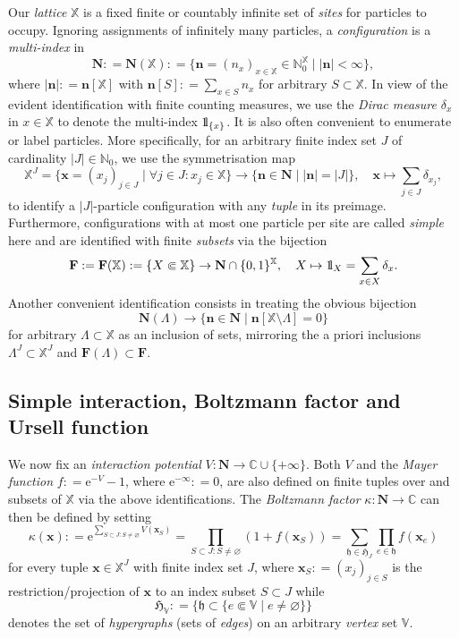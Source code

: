 \documentclass[10pt,a4paper]{amsart}
\newcommand{\e}{\mathrm{e}}
\newcommand{\N}{\mathbb{N}}
\newcommand{\C}{\mathbb{C}}
\newcommand{\X}{\mathbb X}
\newcommand{\V}{\mathbb V}
\def\1{{\mathchoice {1\mskip-4mu\mathrm l}      
{1\mskip-4mu\mathrm l}
{1\mskip-4.5mu\mathrm l} {1\mskip-5mu\mathrm l}}}
\begin{document}
Our \emph{lattice} $\X$ is a fixed finite or countably infinite set of \emph{sites} for particles to occupy. 
Ignoring assignments of infinitely many particles, a \emph{configuration} is a \emph{multi-index} in
\[
	\mathbf N : = \mathbf N(\X) : = \{\mathbf n = (n_x)_{x \in \X} \in \N_0^\X \mid |\mathbf n| < \infty\},
\]
where $|\mathbf n| : = \mathbf n[\X]$ with $\mathbf n[S] : = \sum_{x \in S} n_x$ for arbitrary $S \subset \X$. 
In view of the evident identification with finite counting measures, we use the \emph{Dirac measure} $\delta_x$ in $x \in \X$ to denote the multi-index $\1_{\{x\}}$. 
It is also often convenient to enumerate or label particles. 
More specifically, for an arbitrary finite index set $J$ of cardinality $|J| \in \N_0$, we use the symmetrisation map
\[
	\X^J = \{\mathbf x = (x_j)_{j \in J} \mid \forall j \in J : x_j \in \X\} \to \{\mathbf n \in \mathbf N \mid |\mathbf n| = |J|\}, \quad \mathbf x \mapsto \sum_{j \in J} \delta_{x_j},
\]
to identify a $|J|$-particle configuration with any \emph{tuple} in its preimage. 
Furthermore, configurations with at most one particle per site are called \emph{simple} here and are identified with finite \emph{subsets} via the bijection
\[
	\mathbf F : = \mathbf F(\X) : = \{X \Subset \X\} \to \mathbf N \cap \{0,1\}^\X, \quad X \mapsto \1_X = \sum_{x \in X} \delta_x.
\]
Another convenient identification consists in treating the obvious bijection
\[
	\mathbf N(\Lambda) \to \{\mathbf n \in \mathbf N \mid \mathbf n[\X \setminus \Lambda] = 0\}
\]
for arbitrary $\Lambda \subset \X$ as an inclusion of sets, mirroring the a priori inclusions $\Lambda^J \subset \X^J$ and $\mathbf F(\Lambda) \subset \mathbf F$.

\subsection{Simple interaction, Boltzmann factor and Ursell function}

We now fix an \emph{interaction potential} $V : \mathbf N \to \C \cup \{+\infty\}$. 
Both $V$ and the \emph{Mayer function} $f : = \e^{-V} - 1$, where $\e^{-\infty} : = 0$, are also defined on finite tuples over and subsets of $\X$ via the above identifications. 
The \emph{Boltzmann factor} $\kappa : \mathbf N \to \C$ can then be defined by setting
\[
	\kappa(\mathbf x) : = \e^{\sum_{S \subset J : S \neq \varnothing} V(\mathbf x_S)} = \prod_{S \subset J : S \neq \varnothing} (1 + f(\mathbf x_S)) = \sum_{\mathfrak h \in \mathfrak H_J} \prod_{e \in \mathfrak h} f(\mathbf x_e)
\]
for every tuple $\mathbf x \in \X^J$ with finite index set $J$, where $\mathbf x_S : = (x_j)_{j \in S}$ is the restriction/projection of $\mathbf x$ to an index subset $S \subset J$ while
\[
	\mathfrak H_\V : = \{\mathfrak h \subset \{e \Subset \V \mid e \neq \varnothing\}\}
\]
denotes the set of \emph{hypergraphs} (sets of \emph{edges}) on an arbitrary \emph{vertex} set $\V$. 
\end{document}
